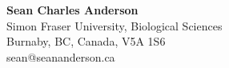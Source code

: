 \documentclass[12pt]{article}
\title{}
\author{}
\date{}
\begin{document}
\begin{spacing}{1}
\thispagestyle{empty}

\begin{center}
{\LARGE \textbf{Sean Charles Anderson}}\\
\vspace{2.8mm}
Simon Fraser University, Biological Sciences\\
Burnaby, BC, Canada, V5A 1S6\\
sean@seananderson.ca\\
\end{center}
\vspace{0.15mm}



\end{spacing}
\end{document}
